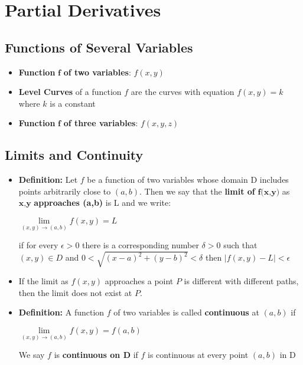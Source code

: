\documentclass{report}
\begin{document}
\chapter{Partial Derivatives}
	\section{Functions of Several Variables}
		\begin{itemize}\addtolength{\leftskip}{2em}
			\item \textbf{Function} $\textbf{f}$ \textbf{of two variables}: $f(x,y)$
			\item \textbf{Level Curves} of a function $f$ are the curves with equation $f(x,y)=k$ where $k$ is a constant
			\item \textbf{Function} $\textbf{f}$ \textbf{of three variables}: $f(x,y,z)$
		\end{itemize}
	\section{Limits and Continuity}
		\begin{itemize}\addtolength{\leftskip}{2em}
			\item \textbf{Definition:} Let $f$ be a function of two  variables whose domain D includes points arbitrarily close to $(a,b)$. Then we say that the \textbf{limit of} $\textbf{f(x,y)}$ as $\textbf{x,y}$ \textbf{approaches (a,b)} is L and we write:
				\begin{center}
				\Large $\lim\limits_{(x,y)\rightarrow (a,b)}f(x,y)=L$
				\end{center} 
				\subitem \large if for every $\epsilon >0$ there is a corresponding number $\delta >0$ such that
				\subitem $(x,y) \in D$ and $0<\sqrt{(x-a)^2+(y-b)^2}<\delta$ then $|f(x,y)-L|<\epsilon$  
			\item If the limit as $f(x,y)$ approaches a point $P$ is different with different paths, then the limit does not exist at $P$.
			\item \textbf{Definition:} A function $f$ of two variables is called \textbf{continuous} at $(a,b)$ if
			\begin{center}
				$\lim\limits_{(x,y)\rightarrow (a,b)}f(x,y)=f(a,b)$
			\end{center} 
			\subitem We say $f$ is \textbf{continuous on D} if $f$ is continuous at every point $(a,b)$ in D
		\end{itemize}
\end{document}
